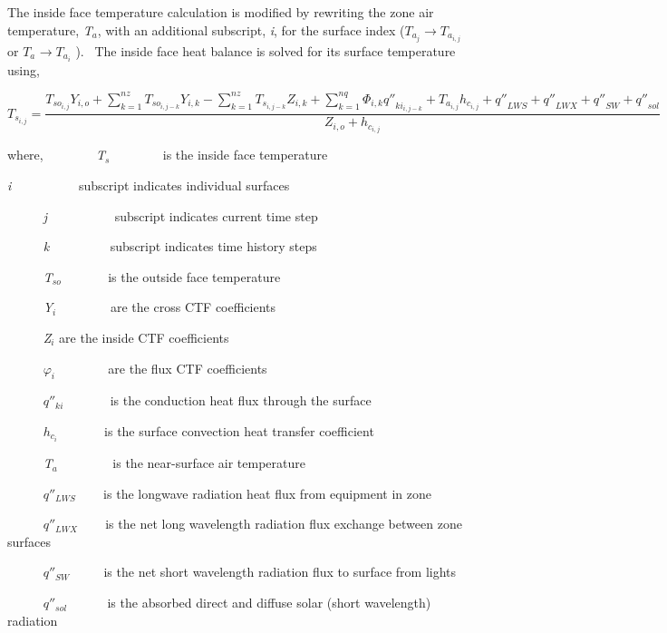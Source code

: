 The inside face temperature calculation is modified by rewriting the zone air temperature, \emph{T\(_{a}\)}, with an additional subscript, \emph{i}, for the surface index (\({T_{{a_j}}} \to {T_{{a_{i,j}}}}\) or \({T_{{a_{}}}} \to {T_{{a_i}}}\) ).~ The inside face heat balance is solved for its surface temperature using,

{\scriptsize
\begin{equation}
{T_{{s_{i,j}}}} = \frac{{{T_{s{o_{i,j}}}}{Y_{i,o}} + \sum\limits_{k = 1}^{nz} {{T_{s{o_{i,j - k}}}}} {Y_{i,k}} - \sum\limits_{k = 1}^{nz} {{T_{{s_{i,j - k}}}}} {Z_{i,k}} + \sum\limits_{k = 1}^{nq} {{\Phi_{i,k}}{{q''}_{k{i_{i,j - k}}}} + {T_{{a_{i,j}}}}{h_{{c_{i,j}}}} + {{q''}_{LWS}} + {{q''}_{LWX}} + {{q''}_{SW}} + {{q''}_{sol}}} }}{{{Z_{i,o}} + {h_{{c_{i,j}}}}}}
\end{equation}}

where, ~~~~~~~ \emph{T\(_{s}\)} ~~~~~~~ is the inside face temperature

\emph{i}~~~~~~~~~~ subscript indicates individual surfaces

~~~~~ \emph{j}~~~~~~~~~~ subscript indicates current time step

~~~~~ \emph{k}~~~~~~~~~ subscript indicates time history steps

~~~~~ \emph{T\(_{so}\)} ~~~~~~ is the outside face temperature

~~~~~ \emph{Y\(_{i}\) ~~~~~~~} are the cross CTF coefficients

~~~~~ \emph{Z\(_{i}\)} are the inside CTF coefficients

~~~~~ \(\varphi_{i}\) ~~~~~~~ are the flux CTF coefficients

~~~~~ \({q''_{ki}}\) ~~~~~~ is the conduction heat flux through the surface

~~~~~ \({h_{{c_i}}}\) ~~~~~~ is the surface convection heat transfer coefficient

~~~~~ \emph{T\(_{a}\)}~~~~~~~~ is the near-surface air temperature

~~~~~ \({q''_{LWS}}\) ~~~ is the longwave radiation heat flux from equipment in zone

~~~~~ \({q''_{LWX}}\) ~~~ is the net long wavelength radiation flux exchange between zone surfaces

~~~~~ \({q''_{SW}}\) ~~~~ is the net short wavelength radiation flux to surface from lights

~~~~~ \({q''_{sol}}\) ~~~~~ is the absorbed direct and diffuse solar (short wavelength) radiation

